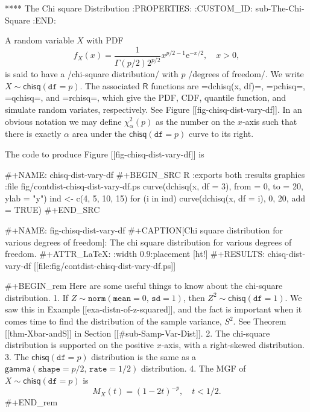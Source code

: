 **** The Chi square Distribution
:PROPERTIES:
:CUSTOM_ID: sub-The-Chi-Square
:END:

A random variable \(X\) with PDF
\begin{equation}
f_{X}(x)=\frac{1}{\Gamma(p/2)2^{p/2}}x^{p/2-1}\mathrm{e}^{-x/2},\quad x>0,
\end{equation}
is said to have a /chi-square distribution/ with \(p\) /degrees of
freedom/. We write \(X\sim\mathsf{chisq}(\mathtt{df}=p)\). The
associated \(\mathsf{R}\) functions are =dchisq(x, df)=, =pchisq=,
=qchisq=, and =rchisq=, which give the PDF, CDF, quantile function,
and simulate random variates, respectively. See Figure
[[fig-chisq-dist-vary-df]]. In an obvious notation we may define
\(\chi_{\alpha}^{2}(p)\) as the number on the \(x\)-axis such that
there is exactly \(\alpha\) area under the
\(\mathsf{chisq}(\mathtt{df}=p)\) curve to its right.

The code to produce Figure [[fig-chisq-dist-vary-df]] is

#+NAME: chisq-dist-vary-df
#+BEGIN_SRC R :exports both :results graphics :file fig/contdist-chisq-dist-vary-df.ps
curve(dchisq(x, df = 3), from = 0, to = 20, ylab = "y")
ind <- c(4, 5, 10, 15)
for (i in ind) curve(dchisq(x, df = i), 0, 20, add = TRUE)
#+END_SRC

#+NAME: fig-chisq-dist-vary-df
#+CAPTION[Chi square distribution for various degrees of freedom]: \small The chi square distribution for various degrees of freedom.
#+ATTR_LaTeX: :width 0.9\textwidth :placement [ht!]
#+RESULTS: chisq-dist-vary-df
[[file:fig/contdist-chisq-dist-vary-df.ps]]

#+BEGIN_rem
Here are some useful things to know about the chi-square distribution.
1. If \(Z\sim\mathtt{norm}(\mathtt{mean}=0,\,\mathtt{sd}=1)\), then
   \(Z^{2}\sim\mathsf{chisq}(\mathtt{df}=1)\). We saw this in Example
   [[exa-distn-of-z-squared]], and the fact is important when it
   comes time to find the distribution of the sample variance,
   \(S^{2}\). See Theorem [[thm-Xbar-andS]] in Section
   [[#sub-Samp-Var-Dist]].
2. The chi-square distribution is supported on the positive
   \(x\)-axis, with a right-skewed distribution.
3. The \(\mathsf{chisq}(\mathtt{df}=p)\) distribution is the same as a
   \(\mathsf{gamma}(\mathtt{shape}=p/2,\,\mathtt{rate}=1/2)\)
   distribution.
4. The MGF of \(X\sim\mathsf{chisq}(\mathtt{df}=p)\) is
   \begin{equation}
   \label{eq-mgf-chisq}
   M_{X}(t)=\left(1-2t\right)^{-p},\quad t < 1/2.
   \end{equation}
#+END_rem

